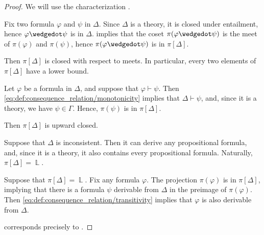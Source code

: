\begin{proof}
   We will use the characterization .

   Fix two formula \( \varphi \) and \( \psi \) in \( \Delta \). Since \( \Delta \) is a theory, it is closed under entailment, hence \( \varphi \synwedge \psi \) is in \( \Delta \).  implies that the coset \( \pi(\varphi \synwedge \psi) \) is the meet of \( \pi(\varphi) \) and \( \pi(\psi) \), hence \( \pi(\varphi \synwedge \psi) \) is in \( \pi[\Delta] \).

  Then \( \pi[\Delta] \) is closed with respect to meets. In particular, every two elements of \( \pi[\Delta] \) have a lower bound.

   Let \( \varphi \) be a formula in \( \Delta \), and suppose that \( \varphi \vdash \psi \). Then \eqref{eq:def:consequence_relation/monotonicity} implies that \( \Delta \vdash \psi \), and, since it is a theory, we have \( \psi \in \Gamma \). Hence, \( \pi(\psi) \) is in \( \pi[\Delta] \).

  Then \( \pi[\Delta] \) is upward closed.


  \SufficiencySubProof* Suppose that \( \Delta \) is inconsistent. Then it can derive any propositional formula, and, since it is a theory, it also contains every propositional formula. Naturally, \( \pi[\Delta] = \BbbL \).

  \NecessitySubProof* Suppose that \( \pi[\Delta] = \BbbL \). Fix any formula \( \varphi \). The projection \( \pi(\varphi) \) is in \( \pi[\Delta] \), implying that there is a formula \( \psi \) derivable from \( \Delta \) in the preimage of \( \pi(\varphi) \). Then \eqref{eq:def:consequence_relation/transitivity} implies that \( \varphi \) is also derivable from \( \Delta \).

    corresponds precisely to .
\end{proof}


